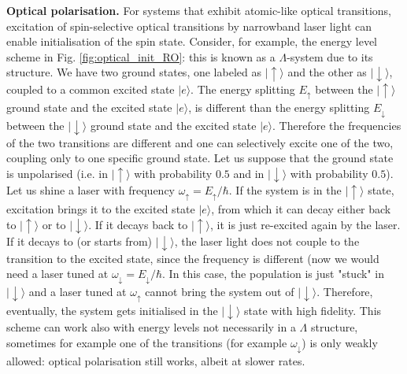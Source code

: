 \documentclass[a4paper,11pt]{article}
\newcommand{\ket}[1]{| #1 \rangle}
\begin{document}
{\bf Optical polarisation.} For systems that exhibit atomic-like optical transitions, excitation of spin-selective optical transitions by narrowband laser light can enable initialisation of the spin state. Consider, for example, the energy level scheme in Fig. \ref{fig:optical_init_RO}: this is known as a $\Lambda$-system due to its structure. We have two ground states, one labeled as $\ket{\uparrow}$ and the other as $\ket{\downarrow}$, coupled to a common excited state $\ket{e}$. The energy splitting $E_{\uparrow}$ between the $\ket{\uparrow}$ ground state and the excited state $\ket{e}$, is different than the  energy splitting $E_{\downarrow}$ between the $\ket{\downarrow}$ ground state and the excited state $\ket{e}$. Therefore the frequencies of the two transitions are different and one can selectively excite one of the two, coupling only to one specific ground state.
\newline Let us suppose that the ground state is unpolarised (i.e. in $\ket{\uparrow}$ with probability $0.5$ and in $\ket{\downarrow}$ with probability $0.5$). Let us shine a laser with frequency $\omega_{\uparrow} = E_{\uparrow}/\hbar$. If the system is in the $\ket{\uparrow}$ state, excitation brings it to the excited state $\ket{e}$, from which it can decay either back to $\ket{\uparrow}$ or to $\ket{\downarrow}$. If it decays back to $\ket{\uparrow}$, it is just re-excited again by the laser. If it decays to (or starts from) $\ket{\downarrow}$, the laser light does not couple to the transition to the excited state, since the frequency is different (now we would need a laser tuned at $\omega_{\downarrow} = E_{\downarrow}/\hbar$. In this case, the population is just "stuck" in $\ket{\downarrow}$ and a laser tuned at $\omega_{\uparrow}$ cannot bring the system out of $\ket{\downarrow}$. Therefore, eventually, the system gets initialised in the $\ket{\downarrow}$ state with high fidelity.
\newline This scheme can work also with energy levels not necessarily in a $\Lambda$ structure, sometimes for example one of the transitions (for example $\omega_{\downarrow}$) is only weakly allowed: optical polarisation still works, albeit at slower rates.
\end{document}

